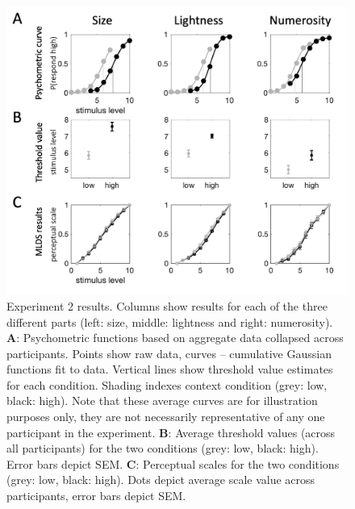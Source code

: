 \documentclass[a4paper, nobind]{templates/ociamthesis}
\begin{document}
\begin{figure}

{\centering \includegraphics[width=1\linewidth]{figures/cat-results-b} 

}

\caption[Experiment 2, Psychometric functions and perceptual scales]{Experiment 2 results. Columns show results for each of the three different parts (left: size, middle: lightness and right: numerosity). $\textbf{A:}$ Psychometric functions based on aggregate data collapsed across participants. Points show raw data, curves -- cumulative Gaussian functions fit to data. Vertical lines show threshold value estimates for each condition. Shading indexes context condition (grey: low, black: high). Note that these average curves are for illustration purposes only, they are not necessarily representative of any one participant in the experiment. $\textbf{B:}$ Average threshold values (across all participants) for the two conditions (grey: low, black: high). Error bars depict SEM. $\textbf{C:}$ Perceptual scales for the two conditions (grey: low, black: high). Dots depict average scale value across participants, error bars depict SEM.}\label{fig:cat-results-b}
\end{figure}
\end{document}
